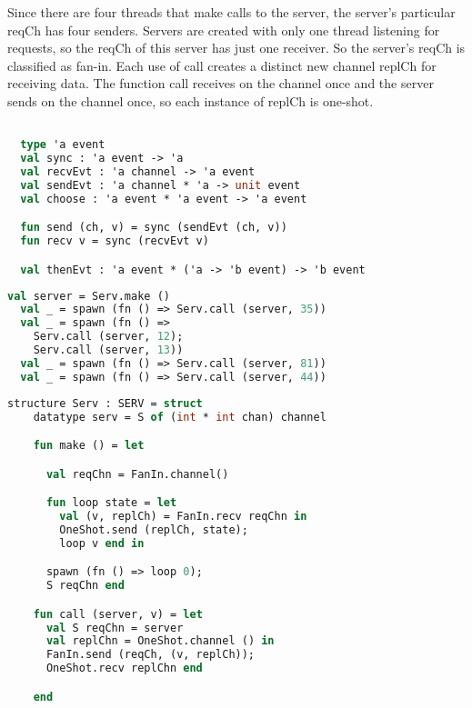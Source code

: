 \documentclass{article}
\begin{document}
Since there are four threads that make calls to the server, the server's particular reqCh has
four senders.  Servers are created with only one thread listening for requests, so the reqCh of
this server has just one receiver.  So the server's reqCh is classified as fan-in.  Each use of
call creates a distinct new channel replCh for receiving data.  The function call receives on
the channel once and the server sends on the channel once, so each instance of replCh is
one-shot.



\begin{lstlisting}[language=ML, escapechar=\%]

  type 'a event
  val sync : 'a event -> 'a
  val recvEvt : 'a channel -> 'a event
  val sendEvt : 'a channel * 'a -> unit event
  val choose : 'a event * 'a event -> 'a event

  fun send (ch, v) = sync (sendEvt (ch, v))
  fun recv v = sync (recvEvt v)

  val thenEvt : 'a event * ('a -> 'b event) -> 'b event

  \end{lstlisting}

\begin{lstlisting}[language=ML, escapechar=\%]
  val server = Serv.make ()
  val _ = spawn (fn () => Serv.call (server, 35))
  val _ = spawn (fn () => 
    Serv.call (server, 12); 
    Serv.call (server, 13))
  val _ = spawn (fn () => Serv.call (server, 81))
  val _ = spawn (fn () => Serv.call (server, 44))
  \end{lstlisting}

\begin{lstlisting}[language=ML, escapechar=\%]
  structure Serv : SERV = struct 
    datatype serv = S of (int * int chan) channel 

    fun make () = let 

      val reqChn = FanIn.channel()

      fun loop state = let
        val (v, replCh) = FanIn.recv reqChn in 
        OneShot.send (replCh, state);
        loop v end in

      spawn (fn () => loop 0);
      S reqChn end 

    fun call (server, v) = let 
      val S reqChn = server
      val replChn = OneShot.channel () in 
      FanIn.send (reqCh, (v, replCh));
      OneShot.recv replChn end

    end
  \end{lstlisting}
\end{document}

